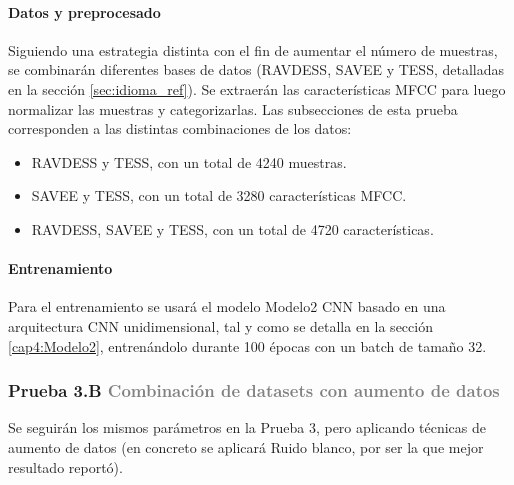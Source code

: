 \documentclass[11pt,a4paper,spanish]{book}
\begin{document}
	\hfill\begin{minipage}{\dimexpr\textwidth-1cm}
		
		\paragraph{Datos y preprocesado} Siguiendo una estrategia distinta con el fin de aumentar el número de muestras, se combinarán diferentes bases de datos (RAVDESS, SAVEE y TESS, detalladas en la sección \ref{sec:idioma_ref}). Se extraerán las características MFCC para luego normalizar las muestras y categorizarlas.
		Las subsecciones de esta prueba corresponden a las distintas combinaciones de los datos:
		\begin{itemize}
			\item RAVDESS y TESS, con un total de 4240 muestras.
			\item SAVEE y TESS, con un total de 3280 características MFCC.
			\item RAVDESS, SAVEE y TESS, con un total de 4720 características.
		\end{itemize}
	
		\paragraph{Entrenamiento} Para el entrenamiento se usará el modelo Modelo2 CNN basado en una arquitectura CNN unidimensional, tal y como se detalla en la sección \ref{cap4:Modelo2}, entrenándolo durante 100 épocas con un batch de tamaño 32.
	\end{minipage}

	\subsubsection[]{\large Prueba 3.B {\normalsize \textcolor{Gray}{Combinación de datasets con aumento de datos}}}
	Se seguirán los mismos parámetros en la Prueba 3, pero aplicando técnicas de aumento de datos (en concreto se aplicará Ruido blanco, por ser la que mejor resultado reportó).
	
\end{document}
